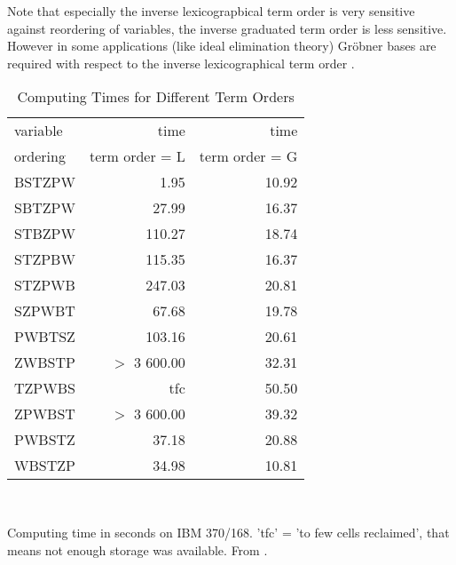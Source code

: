 Note that especially the inverse lexicograpbical term order 
is very sensitive against reordering of variables, 
the inverse graduated term order is less sensitive.
However in some applications (like ideal elimination theory)
Gr\"obner bases are required with respect to the 
inverse lexicographical term order .

\begin{table}
\centering
\begin{tabular}{|l|r|r|}
\hline
      variable  &      time    &      time    \\
      ordering  &   term order = L   &  term order = G \\
\hline
       BSTZPW &               1.95   &      10.92   \\
       SBTZPW &              27.99   &      16.37   \\
       STBZPW &             110.27   &      18.74   \\
       STZPBW &             115.35   &      16.37   \\
       STZPWB &             247.03   &      20.81   \\
       SZPWBT &              67.68   &      19.78   \\
       PWBTSZ &             103.16   &      20.61   \\
       ZWBSTP &       $>$ 3 600.00   &      32.31   \\
       TZPWBS &                tfc   &      50.50   \\
       ZPWBST &       $>$ 3 600.00   &      39.32   \\
       PWBSTZ &              37.18   &      20.88   \\
       WBSTZP &              34.98   &      10.81   \\
\hline
\end{tabular}
\\
\begin{minipage}{8cm}
\footnotesize
Computing time in seconds on IBM 370/168. 
'tfc' = 'to few cells reclaimed', that means 
not enough storage was available. From \cite{BGK 86}.
\end{minipage}
\label{tab:timeto}
\caption{Computing Times for Different Term Orders}
\end{table}



